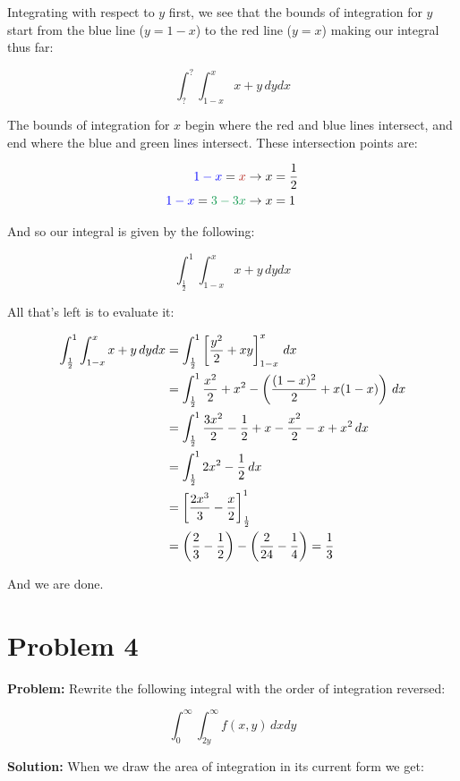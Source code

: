 \documentclass{article}
\begin{document}
Integrating with respect to $y$ first, we see that the bounds of integration for $y$ start from the blue line ($y=1-x$) to the red line ($y=x$) making our integral thus far:

$$\int^?_?\int^{x}_{1-x}x+y\,dydx$$

The bounds of integration for $x$ begin where the red and blue lines intersect, and end where the blue and green lines intersect. These intersection points are:

\begin{align*}
    \textcolor{blue}{1-x}=\textcolor{BrickRed}{x}&\rightarrow x=\frac{1}{2}\\
    \textcolor{blue}{1-x}=\textcolor{ForestGreen}{3-3x}&\rightarrow x=1
\end{align*}

And so our integral is given by the following:

$$\int^1_\frac{1}{2}\int^{x}_{1-x}x+y\,dydx$$

All that's left is to evaluate it:

\begin{align*}
    \int^1_\frac{1}{2}\int^{x}_{1-x}x+y\,dydx&=\int^1_\frac{1}{2}\left[\frac{y^2}{2}+xy\right]_{1-x}^{x}\,dx\\
    &=\int^1_\frac{1}{2}\frac{x^2}{2}+x^2-\left(\frac{(1-x)^2}{2}+x(1-x)\right)\,dx\\
    &=\int^1_\frac{1}{2}\frac{3x^2}{2}-\frac{1}{2}+x-\frac{x^2}{2}-x+x^2\,dx\\
    &=\int^1_\frac{1}{2}2x^2-\frac{1}{2}\,dx\\
    &=\left[\frac{2x^3}{3}-\frac{x}{2}\right]_{\frac{1}{2}}^{1}\\
    &=\left(\frac{2}{3}-\frac{1}{2}\right)-\left(\frac{2}{24}-\frac{1}{4}\right)=\frac{1}{3}
\end{align*}

And we are done.

\section*{Problem 4}
\noindent\textbf{Problem:} Rewrite the following integral with the order of integration reversed:

$$\int_0^\infty\int_{2y}^\infty f(x,y)\,dxdy$$

\noindent\textbf{Solution:} When we draw the area of integration in its current form we get:

\end{document}
